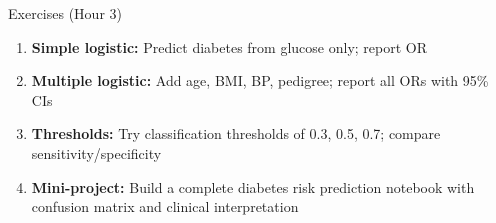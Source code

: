 \documentclass[aspectratio=169,11pt]{beamer}
\begin{document}
\begin{frame}{Exercises (Hour 3)}
\begin{enumerate}
  \item \textbf{Simple logistic:} Predict diabetes from glucose only; report OR
  \item \textbf{Multiple logistic:} Add age, BMI, BP, pedigree; report all ORs with 95\% CIs
  \item \textbf{Thresholds:} Try classification thresholds of 0.3, 0.5, 0.7; compare sensitivity/specificity
  \item \textbf{Mini-project:} Build a complete diabetes risk prediction notebook with confusion matrix and clinical interpretation
\end{enumerate}
\end{frame}
\end{document}
